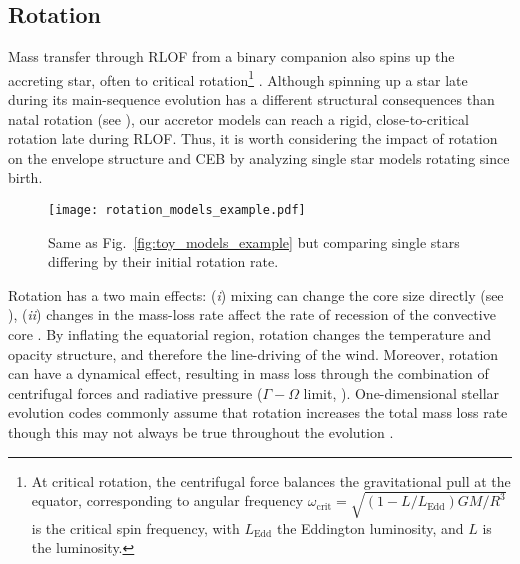 \documentclass[twocolumn,twocolappendix,trackchanges]{aastex63}
\DeclareRobustCommand{\Figref}[1]{Fig.~\ref{#1}}
\begin{document}
\subsection{Rotation}
\label{sec:rot_examples}

Mass transfer through RLOF from a binary companion also spins up the
accreting star, often to critical rotation\footnote{At critical
  rotation, the centrifugal force
  balances the gravitational pull at the equator, corresponding to
  angular frequency
  $\omega_\mathrm{crit}=\sqrt{(1-L/L_\mathrm{Edd})GM/R^3}$ is the
  critical spin frequency, with $L_\mathrm{Edd}$ the Eddington
  luminosity, and $L$ is the luminosity.} \citep[e.g.,][]{lubow:1975,
  packet:1981, cantiello:2007}. Although spinning up a star late during its
main-sequence evolution has a different structural consequences than
natal rotation (see \citealt{renzo:2021zoph}), our accretor models can
reach a rigid, close-to-critical rotation late during RLOF.
Thus, it is worth considering the impact of rotation on the envelope
structure and CEB by analyzing single star models rotating since
birth.

\begin{figure}[htbp]
  \centering
  \texttt{[image: rotation\_models\_example.pdf]}
  \caption{Same as \Figref{fig:toy_models_example} but comparing
    single stars differing by their initial rotation rate.}
  \label{fig:rotation_models_example}
\end{figure}

Rotation has a two main effects: (\emph{i}) mixing can change the core
size directly (see \citealt{heger:2000, maeder:00}), (\emph{ii})
changes in the mass-loss rate \cite[e.g.,][]{langer:1998, muller:2014,
  gagnier:2019} affect the rate of recession of the convective core
\citep[e.g.,][]{renzo:2017, renzo:2020ppi_conv}. By inflating the
equatorial region, rotation changes the temperature and opacity
structure, and therefore the line-driving of the wind. Moreover,
rotation can have a dynamical effect, resulting in mass loss through
the combination of centrifugal forces and radiative pressure
($\Gamma-\Omega$ limit, \citealt{langer:1998}). One-dimensional stellar
evolution codes commonly assume that rotation increases the total mass
loss rate \citep[e.g.,][]{langer:1998, heger:2000} though this may not
always be true throughout the evolution \citep[e.g.,][]{gagnier:2019}.
\end{document}
